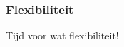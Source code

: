 \begin{frame}\frametitle{Flexibiliteit}
    \huge{\hfill Tijd voor wat flexibiliteit! \hfill}
\end{frame}
